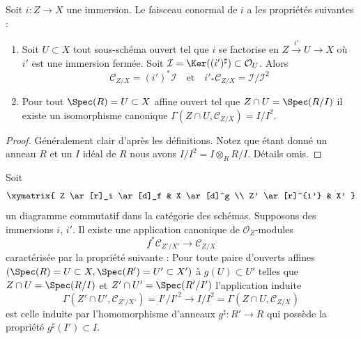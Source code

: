 \begin{lemma}
\label{lemma-affine-conormal}
Soit $i : Z \to X$ une immersion. Le faisceau conormal de $i$
a les propriétés suivantes :
\begin{enumerate}
\item Soit $U \subset X$ tout sous-schéma ouvert tel
que $i$ se factorise en $Z \xrightarrow{i'} U \to X$ où $i'$
est une immersion fermée. Soit $\mathcal{I} = \Ker((i')^\sharp) \subset \mathcal{O}_U$.
Alors
$$
\mathcal{C}_{Z/X} = (i')^*\mathcal{I}\quad\text{et}\quad
i'_*\mathcal{C}_{Z/X} = \mathcal{I}/\mathcal{I}^2
$$
\item
Pour tout $\Spec(R) = U \subset X$ affine
ouvert tel que $Z \cap U = \Spec(R/I)$ il
existe un isomorphisme
canonique $\Gamma(Z \cap U, \mathcal{C}_{Z/X}) = I/I^2$.
\end{enumerate}
\end{lemma}

\begin{proof}
Généralement clair d'après les définitions. Notez que étant donné un anneau $R$
et un $I$ idéal de $R$ nous avons $I/I^2 = I \otimes_R R/I$. Détails omis.
\end{proof}

\begin{lemma}
\label{lemma-conormal-functorial}
Soit
$$
\xymatrix{
Z \ar[r]_i \ar[d]_f & X \ar[d]^g \\
Z' \ar[r]^{i'} & X'
}
$$
un diagramme commutatif dans la catégorie des schémas. Supposons
des immersions $i$, $i'$. Il existe une application
canonique de $\mathcal{O}_Z$-modules
$$
f^*\mathcal{C}_{Z'/X'}
\longrightarrow
\mathcal{C}_{Z/X}
$$
caractérisée par la propriété suivante : Pour toute
paire d'ouverts affines $(\Spec(R) = U \subset X, \Spec(R') = U' \subset X')$ à
$g(U) \subset U'$ telles que
$Z \cap U = \Spec(R/I)$ et $Z' \cap U' = \Spec(R'/I')$ l'application
induite
$$
\Gamma(Z' \cap U', \mathcal{C}_{Z'/X'}) = I'/I'^2
\longrightarrow
I/I^2 = \Gamma(Z \cap U, \mathcal{C}_{Z/X})
$$
est celle induite par l'homomorphisme d'anneaux $g^\sharp : R' \to R$
qui possède la propriété $g^\sharp(I') \subset I$.
\end{lemma}

